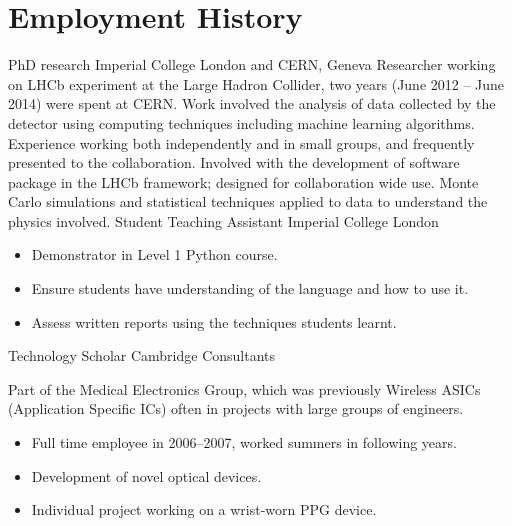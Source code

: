 \section{Employment History}
{PhD research}
{Imperial College London and CERN, Geneva}
{}{}
{
  Researcher working on LHCb experiment at the Large Hadron Collider, two years (June 2012 -- June
  2014) were spent at CERN.
  Work involved the analysis of data collected by the detector using computing techniques including
  machine learning algorithms.
  Experience working both independently and in small groups, and frequently presented to the
  collaboration.
  Involved with the development of software package in the LHCb framework; designed for
  collaboration wide use.
  Monte Carlo simulations and statistical techniques applied to data to understand the physics
  involved.
}
{Student Teaching Assistant}
{Imperial College London}
{}{}
{
  \begin{itemize}
    \item Demonstrator in Level 1 Python course.
    \item Ensure students have understanding of the language and how to use it.
    \item Assess written reports using the techniques students learnt.
  \end{itemize}
}
{Technology Scholar}
{Cambridge Consultants}
{}{}
{
  Part of the Medical Electronics Group, which was previously Wireless ASICs (Application
  Specific ICs) often in projects with large groups of engineers.
  \begin{itemize}
    \item Full time employee in 2006--2007, worked summers in following years.
    \item Development of novel optical devices.
    \item Individual project working on a wrist-worn PPG device.
  \end{itemize}
}


